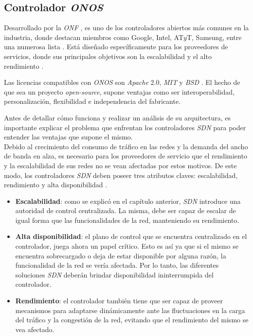 \subsection{Controlador \textit{ONOS}}
Desarrollado por la \textit{ONF} \parencite{onff}, es uno de los controladores abiertos más comunes en la industria, donde destacan miembros como Google, Intel, AT$y$T, Samsung, entre una numerosa lista \parencite{onffmembers}. Está diseñado específicamente para los proveedores de servicios, donde sus principales objetivos son la escalabilidad y el alto rendimiento \parencite{onffwhite}.

Las licencias compatibles con \textit{ONOS} son \textit{Apache} 2.0, \textit{MIT} y \textit{BSD} \parencite{onfflic}. El hecho de que sea un proyecto \textit{open-source}, supone ventajas como ser interoperabilidad, personalización, flexibilidad e independencia del fabricante. 

Antes de detallar cómo funciona y realizar un análisis de su arquitectura, es importante explicar el problema que enfrentan los controladores \textit{SDN} para poder entender las ventajas que supone el mismo. 
\\

Debido al crecimiento del consumo de tráfico en las redes y la demanda del ancho de banda en alza, es necesario para los proveedores de servicio que el rendimiento y la escalabilidad de sus redes no se vean afectadas por estos motivos. De este modo, los controladores \textit{SDN} deben poseer tres atributos claves: escalabilidad, rendimiento y alta disponibilidad \parencite{sdnproblema}.

\begin{itemize}
	\item \textbf{Escalabilidad}: como se explicó en el capítulo anterior, \textit{SDN} introduce una autoridad de control centralizada. La misma, debe ser capaz de escalar de igual forma que las funcionalidades de la red, manteniendo su rendimiento.
	\item \textbf{Alta disponibilidad}: el plano de control que se encuentra centralizado en el controlador, juega ahora un papel crítico. Esto es así ya que si el mismo se encuentra sobrecargado o deja de estar disponible por alguna razón, la funcionalidad de la red se vería afectada. Por lo tanto, las diferentes soluciones \textit{SDN} deberán brindar disponibilidad ininterrumpida del controlador.
	\item \textbf{Rendimiento}: el controlador también tiene que ser capaz de proveer mecanismos para adaptarse dinámicamente ante las fluctuaciones en la carga del tráfico y la congestión de la red, evitando que el rendimiento del mismo se vea afectado. 
\end{itemize}

